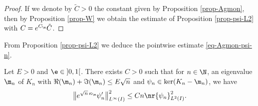 \begin{proof}
If we denote by $\tilde C > 0$ the constant given by Proposition \ref{prop-Agmon}, then by Proposition \ref{prop-W} we obtain the estimate of Proposition \ref{prop-psi-L2} with $C = e^{C_\e} \tilde C$.
\end{proof}

From Proposition \ref{prop-psi-L2} we deduce the pointwise estimate \eqref{eq-Agmon-psi-n}.

\begin{proposition} \label{prop-psi-Linf}
Let $E > 0$ and $\e \in{}]0,1[$. There exists $C > 0$ such that for $n \in \N$, an eigenvalue $\m_n$ of $K_n$ with $\Re(\m_n) + \Im(\m_n) \leq E \sqrt n$ and $\psi_n \in \ker(K_n-\m_n)$, we have
\[
\big\|e^{\sqrt n\,\kappa_\e} \psi_n'\big\|_{L^\infty(I)}^2 \leq C n \nr{\psi_n}_{L^2(I)}^2.
\]
\end{proposition}

